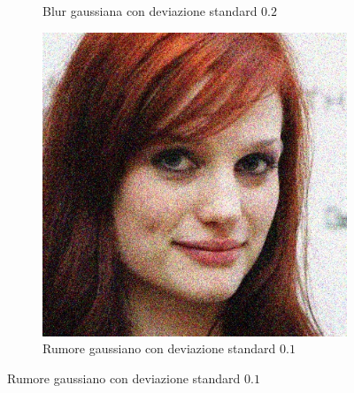 \begin{figure}[ht]
\begin{subfigure}[t]{0.18\textwidth}
\caption{Blur gaussiana con deviazione standard $0.2$}
\label{sfig:corruption_gaussian_blur}
\end{subfigure}\hfill
\begin{subfigure}[t]{0.18\textwidth}
\includegraphics[width=\textwidth]{./Images/gaussian_noise_severity_0.1.jpg}
\caption{Rumore gaussiano con deviazione standard $0.1$}
\label{sfig:corruption_gaussian_noise}
\end{subfigure}\hfill


\end{figure}
